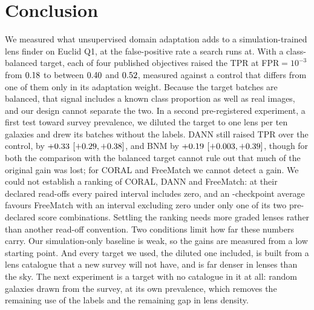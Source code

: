 \section{Conclusion}
\label{sec:conclusion}

We measured what unsupervised domain adaptation adds to a simulation-trained lens finder on
Euclid Q1, at the false-positive rate a search runs at. With a class-balanced target, each of
four published objectives raised the TPR at FPR${}=10^{-3}$ from $0.18{}$ to between
$0.40{}$ and $0.52{}$, measured against a control that differs from one of them only
in its adaptation weight. Because the target batches are balanced, that signal includes a known
class proportion as well as real images, and our design cannot separate the two. In a second
pre-registered experiment, a first test toward survey prevalence, we diluted the target to one
lens per ten galaxies and drew its batches without the labels. DANN still raised TPR over the
control, by $+0.33{}$ $[+0.29{}, +0.38{}]$, and BNM by $+0.19{}$
$[+0.003{}, +0.39{}]$, though for both the comparison with the balanced target
cannot rule out that much of the original gain was lost; for CORAL and FreeMatch we cannot detect a gain. We
could not establish a ranking of CORAL, DANN and FreeMatch: at their declared read-offs every
paired interval includes zero, and an \rwFiveKWord{}-checkpoint average favours FreeMatch with an
interval excluding zero under only one of its two pre-declared score combinations. Settling the
ranking needs more graded lenses rather than another read-off convention. Two conditions limit how far
these numbers carry. Our simulation-only baseline is weak, so the gains are measured from a low
starting point. And every target we used, the diluted one included, is built from a lens
catalogue that a new survey will not have, and is far denser in lenses than the sky. The next
experiment is a target with no catalogue in it at all: random galaxies drawn from the survey, at
its own prevalence, which removes the remaining use of the labels and the remaining gap in lens
density.
